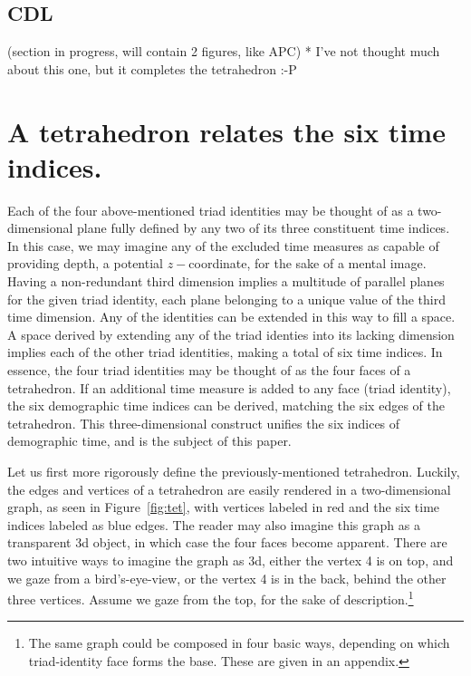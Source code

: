 \documentclass[11pt,oneside,a4paper]{article} %
\newcommand\tgh[1]{\raisebox{-.25\height}{\texttt{[image: Figures/triadtable/triad\#1.pdf]}}}
\begin{document}
\FloatBarrier
\subsection*{CDL}%
\FloatBarrier
(section in progress, will contain 2 figures, like APC)
* I've not thought much about this one, but it completes the tetrahedron :-P


\section*{A tetrahedron relates the six time indices.}
Each of the four above-mentioned triad identities may be thought of as a
two-dimensional plane fully defined by any two of its three constituent time
indices.
In this case, we may imagine any of the excluded time measures as capable of
providing depth, a potential $z-$coordinate, for the sake of a mental image.
Having a non-redundant third dimension implies a multitude of parallel planes
for the given triad identity, each plane belonging to a unique value of the
third time dimension. Any of the identities can be extended in this way to fill a space. A space derived by
extending any of the triad identies into its lacking dimension implies each of the
other triad identities, making a total of six time indices. In essence, the
four triad identities may be thought of as the four faces of a
tetrahedron. If an additional time measure is added to any face (triad
identity), the six demographic time indices can be derived, matching the six edges of the tetrahedron. This three-dimensional construct unifies the six indices of demographic time, and is the subject of this paper.

Let us first more rigorously define the previously-mentioned tetrahedron.
Luckily, the edges and vertices of a tetrahedron are easily rendered in a
two-dimensional graph, as seen in Figure~\ref{fig:tet}, with vertices labeled
in red and the six time indices labeled as blue edges. The reader may also imagine this graph as a transparent 3d object, in which case the four faces become apparent. There
are two intuitive ways to imagine the graph as 3d, either the vertex 4 is on top, and we gaze from a bird's-eye-view, or the vertex 4 is in the back, behind the other three vertices. Assume we
gaze from the top, for the sake of description.\footnote{The same graph
could be composed in four basic ways, depending on which triad-identity face
forms the base.
These are given in an appendix.} 
\end{document}
